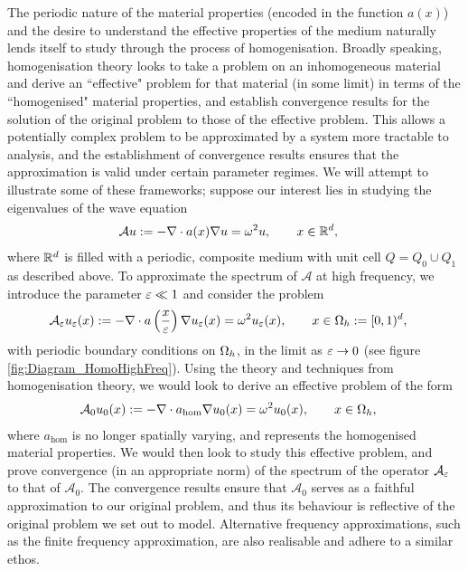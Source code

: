 The periodic nature of the material properties (encoded in the function $a(x)$) and the desire to understand the effective properties of the medium naturally lends itself to study through the process of homogenisation.
Broadly speaking, homogenisation theory looks to take a problem on an inhomogeneous material and derive an ``effective" problem for that material (in some limit) in terms of the ``homogenised" material properties, and establish convergence results for the solution of the original problem to those of the effective problem.
This allows a potentially complex problem to be approximated by a system more tractable to analysis, and the establishment of convergence results ensures that the approximation is valid under certain parameter regimes.
We will attempt to illustrate some of these frameworks; suppose our interest lies in studying the eigenvalues of the wave equation
\begin{align*}
	\mathcal{A}u &:= -\nabla\cdot a(x)\nabla u = \omega^2 u, \qquad x\in\mathbb{R}^d,
\end{align*}
where $\mathbb{R}^d$ is filled with a periodic, composite medium with unit cell $Q=Q_0\cup Q_1$ as described above.
To approximate the spectrum of $\mathcal{A}$ at high frequency, we introduce the parameter $\varepsilon\ll 1$ and consider the problem
\begin{align*}
	\mathcal{A}_{\varepsilon}u_{\varepsilon}(x) &:= -\nabla\cdot a\left( \frac{x}{\varepsilon} \right)\nabla u_{\varepsilon}(x) = \omega^2 u_{\varepsilon}(x), \qquad x\in\Omega_{h}:=[0,1)^d,
\end{align*}
with periodic boundary conditions on $\Omega_h$, in the limit as $\varepsilon\rightarrow0$ (see figure \ref{fig:Diagram_HomoHighFreq}).
Using the theory and techniques from homogenisation theory, we would look to derive an effective problem of the form
\begin{align*}
	\mathcal{A}_0 u_0(x) &:= -\nabla\cdot a_{\mathrm{hom}}\nabla u_0(x) = \omega^2 u_0(x), \qquad x\in\Omega_h,
\end{align*} 
where $a_{\mathrm{hom}}$ is no longer spatially varying, and represents the homogenised material properties.
We would then look to study this effective problem, and prove convergence (in an appropriate norm) of the spectrum of the operator $\mathcal{A}_{\varepsilon}$ to that of $\mathcal{A}_0$.
The convergence results ensure that $\mathcal{A}_0$ serves as a faithful approximation to our original problem, and thus its behaviour is reflective of the original problem we set out to model.
Alternative frequency approximations, such as the finite frequency approximation, are also realisable and adhere to a similar ethos.
